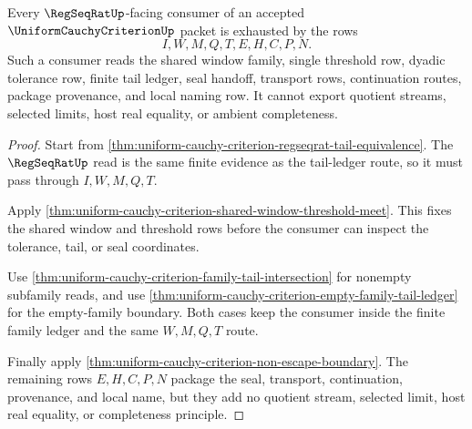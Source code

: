 
\begin{theorem}
\label{thm:uniform-cauchy-criterion-regseqrat-uniform-consumer-exhaustion}
Every $\RegSeqRatUp$-facing consumer of an accepted $\UniformCauchyCriterionUp$ packet is exhausted by the rows
$$
I,W,M,Q,T,E,H,C,P,N.
$$
Such a consumer reads the shared window family, single threshold row, dyadic tolerance row, finite tail ledger, seal handoff, transport rows, continuation routes, package provenance, and local naming row. It cannot export quotient streams, selected limits, host real equality, or ambient completeness.
\end{theorem}
\begin{proof}
Start from \autoref{thm:uniform-cauchy-criterion-regseqrat-tail-equivalence}. The $\RegSeqRatUp$ read is the same finite evidence as the tail-ledger route, so it must pass through $I,W,M,Q,T$.

Apply \autoref{thm:uniform-cauchy-criterion-shared-window-threshold-meet}. This fixes the shared window and threshold rows before the consumer can inspect the tolerance, tail, or seal coordinates.

Use \autoref{thm:uniform-cauchy-criterion-family-tail-intersection} for nonempty subfamily reads, and use \autoref{thm:uniform-cauchy-criterion-empty-family-tail-ledger} for the empty-family boundary. Both cases keep the consumer inside the finite family ledger and the same $W,M,Q,T$ route.

Finally apply \autoref{thm:uniform-cauchy-criterion-non-escape-boundary}. The remaining rows $E,H,C,P,N$ package the seal, transport, continuation, provenance, and local name, but they add no quotient stream, selected limit, host real equality, or completeness principle.
\end{proof}

